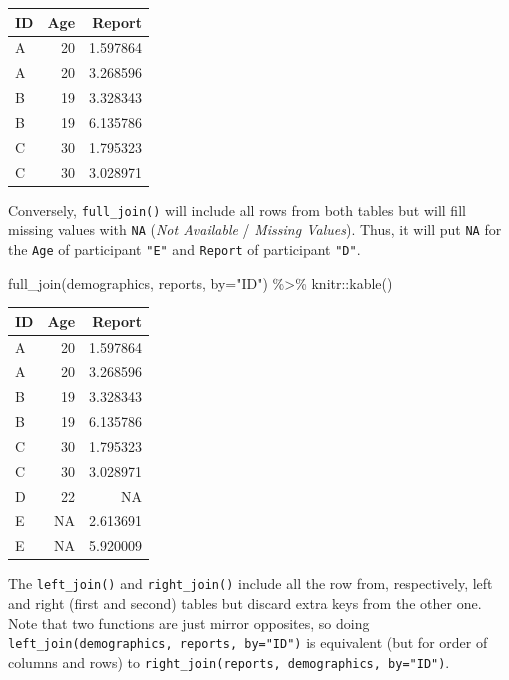 \documentclass[
]{book}
\newenvironment{Shaded}{\begin{snugshade}}{\end{snugshade}}
\newcommand{\AttributeTok}[1]{\textcolor[rgb]{0.77,0.63,0.00}{#1}}
\newcommand{\FunctionTok}[1]{\textcolor[rgb]{0.00,0.00,0.00}{#1}}
\newcommand{\NormalTok}[1]{#1}
\newcommand{\SpecialCharTok}[1]{\textcolor[rgb]{0.00,0.00,0.00}{#1}}
\newcommand{\StringTok}[1]{\textcolor[rgb]{0.31,0.60,0.02}{#1}}
\begin{document}
\begin{tabular}{l|r|r}
\hline
ID & Age & Report\\
\hline
A & 20 & 1.597864\\
\hline
A & 20 & 3.268596\\
\hline
B & 19 & 3.328343\\
\hline
B & 19 & 6.135786\\
\hline
C & 30 & 1.795323\\
\hline
C & 30 & 3.028971\\
\hline
\end{tabular}

Conversely, \texttt{full\_join()} will include all rows from both tables but will fill missing values with \texttt{NA} (\emph{Not Available} / \emph{Missing Values}). Thus, it will put \texttt{NA} for the \texttt{Age} of participant \texttt{"E"} and \texttt{Report} of participant \texttt{"D"}.

\begin{Shaded}
\begin{Highlighting}[]
\FunctionTok{full\_join}\NormalTok{(demographics, reports, }\AttributeTok{by=}\StringTok{"ID"}\NormalTok{) }\SpecialCharTok{\%\textgreater{}\%}
\NormalTok{  knitr}\SpecialCharTok{::}\FunctionTok{kable}\NormalTok{()}
\end{Highlighting}
\end{Shaded}

\begin{tabular}{l|r|r}
\hline
ID & Age & Report\\
\hline
A & 20 & 1.597864\\
\hline
A & 20 & 3.268596\\
\hline
B & 19 & 3.328343\\
\hline
B & 19 & 6.135786\\
\hline
C & 30 & 1.795323\\
\hline
C & 30 & 3.028971\\
\hline
D & 22 & NA\\
\hline
E & NA & 2.613691\\
\hline
E & NA & 5.920009\\
\hline
\end{tabular}

The \texttt{left\_join()} and \texttt{right\_join()} include all the row from, respectively, left and right (first and second) tables but discard extra keys from the other one. Note that two functions are just mirror opposites, so doing \texttt{left\_join(demographics,\ reports,\ by="ID")} is equivalent (but for order of columns and rows) to \texttt{right\_join(reports,\ demographics,\ by="ID")}.
\end{document}
